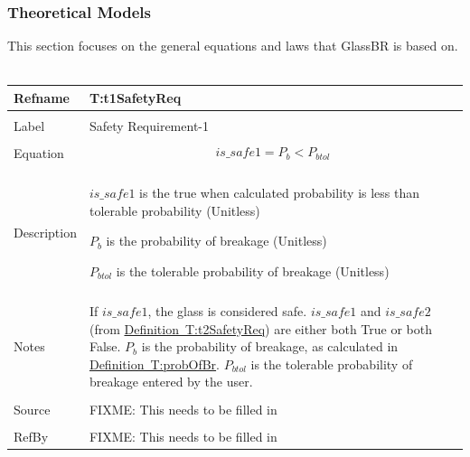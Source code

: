 \documentclass[12pt]{article}
\begin{document}
\subsubsection{Theoretical Models}
\label{Sec:TMs}
This section focuses on the general equations and laws that GlassBR is based on.
~\newline
\noindent \begin{minipage}{\textwidth}
\begin{tabular}{p{} p{}}
\toprule \textbf{Refname} & \textbf{T:t1SafetyReq}
\label{T:t1SafetyReq}
\\ \midrule \\
Label & Safety Requirement-1
\\ \midrule \\
Equation & \begin{dmath}
           is\_safe1={P_{b}}<{P_{btol}}
           \end{dmath}
\\ \midrule \\
Description & \begin{symbDescription}
              \item{$is\_safe1$ is the true when calculated probability is less than tolerable probability (Unitless)}
              \item{${P_{b}}$ is the probability of breakage (Unitless)}
              \item{${P_{btol}}$ is the tolerable probability of breakage (Unitless)}
              \end{symbDescription}
\\ \midrule \\
Notes & If $is\_safe1$, the glass is considered safe. $is\_safe1$ and $is\_safe2$ (from \hyperref[T:t2SafetyReq]{Definition~T:t2SafetyReq}) are either both True or both False. ${P_{b}}$ is the probability of breakage, as calculated in \hyperref[T:probOfBr]{Definition~T:probOfBr}. ${P_{btol}}$ is the tolerable probability of breakage entered by the user.
\\ \midrule \\
Source & FIXME: This needs to be filled in
\\ \midrule \\
RefBy & FIXME: This needs to be filled in
\\ \bottomrule \end{tabular}
\end{minipage}\\
~\newline
\end{document}
